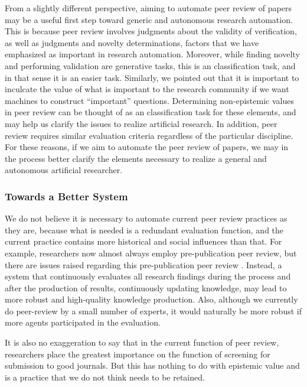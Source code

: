 \documentclass{book}
\begin{document}
From a slightly different perspective, aiming to automate peer review of papers may be a useful first step toward generic and autonomous research automation. This is because peer review involves judgments about the validity of verification, as well as judgments and novelty determinations, factors that we have emphasized as important in research automation. Moreover, while finding novelty and performing validation are generative tasks, this is an classification task, and in that sense it is an easier task. Similarly, we pointed out that it is important to inculcate the value of what is important to the research community if we want machines to construct ``important'' questions. Determining non-epistemic values in peer review can be thought of as an classification task for these elements, and may help us clarify the issues to realize artificial research. In addition, peer review requires similar evaluation criteria regardless of the particular discipline. For these reasons, if we aim to automate the peer review of papers, we may in the process better clarify the elements necessary to realize a general and autonomous artificial researcher.

\subsubsection{Towards a Better System}
We do not believe it is necessary to automate current peer review practices as they are, because what is needed is a redundant evaluation function, and the current practice contains more historical and social influences than that. For example, researchers now almost always employ pre-publication peer review, but there are issues raised regarding this pre-publication peer review \cite{heesen2021peer}. Instead, a system that continuously evaluates all research findings during the process and after the production of results, continuously updating knowledge, may lead to more robust and high-quality knowledge production. Also, although we currently do peer-review by a small number of experts, it would naturally be more robust if more agents participated in the evaluation.

It is also no exaggeration to say that in the current function of peer review, researchers place the greatest importance on the function of screening for submission to good journals. But this has nothing to do with epistemic value and is a practice that we do not think needs to be retained.
\end{document}

